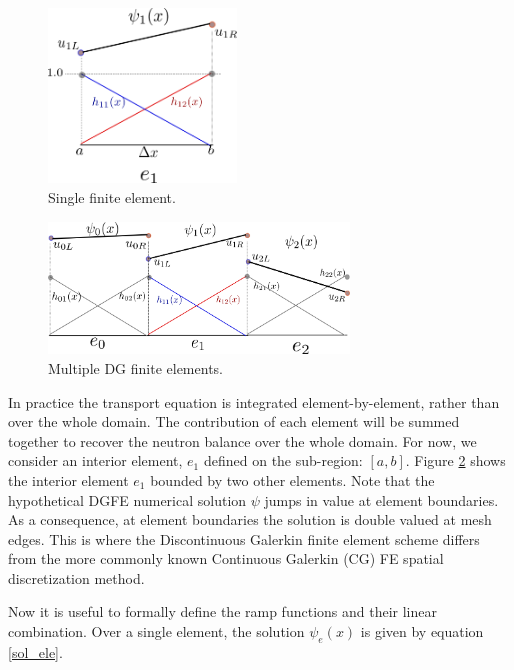 \begin{figure}[!htbp]
\centering
\includegraphics[width=5cm]{images/single_ele.png}
\caption{Single finite element.}
\label{single_ele}
\end{figure}

\begin{figure}[!htbp]
\centering
\includegraphics[width=8cm]{images/multi_ele.png}
\caption{Multiple DG finite elements.}
\label{multi_ele}
\end{figure}

In practice the transport equation is integrated element-by-element, rather than over the whole domain.  The contribution of each element will be summed together to recover the neutron balance over the whole domain.  For now, we consider an interior element, $e_1$ defined on the sub-region: $[a, b]$.  Figure \ref{multi_ele} shows the interior element $e_1$ bounded by two other elements.  Note that the hypothetical DGFE numerical solution $\psi$ jumps in value at element boundaries.  As a consequence, at element boundaries the solution is double valued at mesh edges.  This is where the Discontinuous Galerkin finite element scheme differs from the more commonly known Continuous Galerkin (CG) FE spatial discretization method.

Now it is useful to formally define the ramp functions and their linear combination.  Over a single element, the solution $\psi_e(x)$ is given by equation \ref{sol_ele}.

